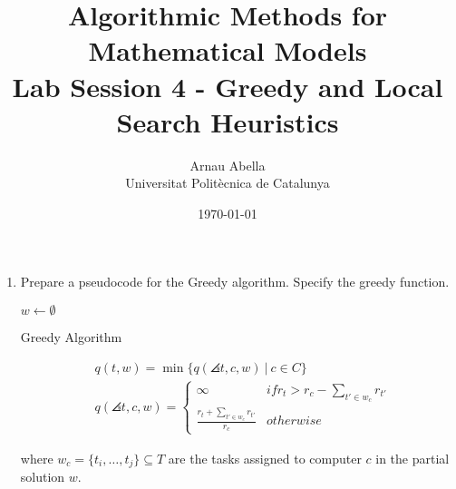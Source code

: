 \documentclass[12pt, a4paper]{article}
\title{%
  \vspace{-10ex}
  \Large{Algorithmic Methods for Mathematical Models} \\
  \large{Lab Session 4 - Greedy and Local Search Heuristics}
}
\author{%
  Arnau Abella \\
  \large{Universitat Polit\`ecnica de Catalunya}
}
\date{\today}
\begin{document}
\maketitle

\vspace{5ex}
\begin{enumerate}[label=(\alph*)]
    \item[\textcolor{QuestionBlue}{\textbullet}] \textcolor{QuestionBlue}{Prepare a pseudocode for the Greedy algorithm. Specify the greedy function.}

    \begin{algorithm}[H]
      \SetAlgoLined
      \DontPrintSemicolon
      $w \leftarrow \emptyset$\;

      \;
      \caption{Greedy Algorithm}
    \end{algorithm}

    \begin{figure}[H]
      \begin{align*}
        &q(t,w) = \min \{ q(\angles{t, c}, w) \ | \ c \in C \}\\
        &q(\angles{t, c}, w) =
          \begin{cases}
            \infty& if r_{t} > r_{c} - \sum_{t' \in w_{c}}r_{t'}  \\
            \frac{r_{t} + \sum_{t' \in w_{c}}r_{t'}}{r_{c}} & otherwise
          \end{cases}
      \end{align*}
    \end{figure}

    where $w_{c} = \{t_{i}, \ldots, t_{j} \} \subseteq T$ are the tasks assigned to computer $c$ in the partial solution $w$.


\end{enumerate}
\end{document}
